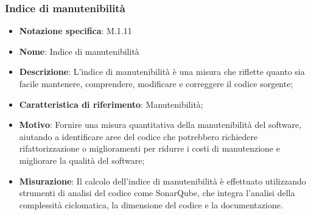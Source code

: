 \subsubsection{Indice di manutenibilità}
\begin{itemize}
    \item \textbf{Notazione specifica}: M.1.11
    \item \textbf{Nome}: Indice di manutenibilità
    \item \textbf{Descrizione}: L'indice di manutenibilità è una misura che riflette quanto sia facile mantenere, comprendere, modificare e correggere il codice sorgente;
    \item \textbf{Caratteristica di riferimento}: Manutenibilità;
    \item \textbf{Motivo}: Fornire una misura quantitativa della manutenibilità del software, aiutando a identificare aree del codice che potrebbero richiedere rifattorizzazione o miglioramenti per ridurre i costi di manutenzione e migliorare la qualità del software;
    \item \textbf{Misurazione}: Il calcolo dell'indice di manutenibilità è effettuato utilizzando strumenti di analisi del codice come SonarQube, che integra l'analisi della complessità ciclomatica, la dimensione del codice e la documentazione.
\end{itemize}
